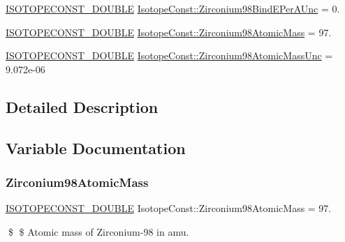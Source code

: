 \begin{DoxyCompactItemize}
\mbox{\hyperlink{group___isotope_const-_macros_ga8f45a7272ce02c0b4c65c44636ed719a}{I\+S\+O\+T\+O\+P\+E\+C\+O\+N\+S\+T\+\_\+\+D\+O\+U\+B\+LE}} \mbox{\hyperlink{group___isotope_const-_zirconium-_zr98_ga880751acf32776a76fe1de0c6e77a870}{Isotope\+Const\+::\+Zirconium98\+Bind\+E\+Per\+A\+Unc}} = 0.
\item 
\mbox{\hyperlink{group___isotope_const-_macros_ga8f45a7272ce02c0b4c65c44636ed719a}{I\+S\+O\+T\+O\+P\+E\+C\+O\+N\+S\+T\+\_\+\+D\+O\+U\+B\+LE}} \mbox{\hyperlink{group___isotope_const-_zirconium-_zr98_ga56045a7a12f5a64716c84848d674f1d0}{Isotope\+Const\+::\+Zirconium98\+Atomic\+Mass}} = 97.
\item 
\mbox{\hyperlink{group___isotope_const-_macros_ga8f45a7272ce02c0b4c65c44636ed719a}{I\+S\+O\+T\+O\+P\+E\+C\+O\+N\+S\+T\+\_\+\+D\+O\+U\+B\+LE}} \mbox{\hyperlink{group___isotope_const-_zirconium-_zr98_gaf0e05fe8fd59380c1db7e630cdbadd06}{Isotope\+Const\+::\+Zirconium98\+Atomic\+Mass\+Unc}} = 9.\+072e-\/06
\end{DoxyCompactItemize}


\subsection{Detailed Description}


\subsection{Variable Documentation}
\mbox{\label{group___isotope_const-_zirconium-_zr98_ga56045a7a12f5a64716c84848d674f1d0}} 
\subsubsection{\texorpdfstring{Zirconium98\+Atomic\+Mass}{Zirconium98AtomicMass}}
{\footnotesize\ttfamily \mbox{\hyperlink{group___isotope_const-_macros_ga8f45a7272ce02c0b4c65c44636ed719a}{I\+S\+O\+T\+O\+P\+E\+C\+O\+N\+S\+T\+\_\+\+D\+O\+U\+B\+LE}} Isotope\+Const\+::\+Zirconium98\+Atomic\+Mass = 97.}

\$ \$ Atomic mass of Zirconium-\/98 in amu. \mbox{\label{group___isotope_const-_zirconium-_zr98_gaf0e05fe8fd59380c1db7e630cdbadd06}} 
